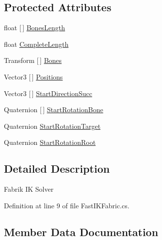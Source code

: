 \subsection*{Protected Attributes}
\begin{DoxyCompactItemize}
\item 
float \mbox{[}$\,$\mbox{]} \mbox{\hyperlink{class_ditzel_games_1_1_fast_i_k_1_1_fast_i_k_fabric_a1e45554459bbf007f925ba70cd489d10}{Bones\+Length}}
\item 
float \mbox{\hyperlink{class_ditzel_games_1_1_fast_i_k_1_1_fast_i_k_fabric_a455382b661f9558006e9ad6fb0745dcc}{Complete\+Length}}
\item 
Transform \mbox{[}$\,$\mbox{]} \mbox{\hyperlink{class_ditzel_games_1_1_fast_i_k_1_1_fast_i_k_fabric_a285d1d2c76ef2e2119a179bb32f0d156}{Bones}}
\item 
Vector3 \mbox{[}$\,$\mbox{]} \mbox{\hyperlink{class_ditzel_games_1_1_fast_i_k_1_1_fast_i_k_fabric_a276fa4e13c8aca407d20828c470908de}{Positions}}
\item 
Vector3 \mbox{[}$\,$\mbox{]} \mbox{\hyperlink{class_ditzel_games_1_1_fast_i_k_1_1_fast_i_k_fabric_af27ff30106ccb2b075bb964fd4091c52}{Start\+Direction\+Succ}}
\item 
Quaternion \mbox{[}$\,$\mbox{]} \mbox{\hyperlink{class_ditzel_games_1_1_fast_i_k_1_1_fast_i_k_fabric_a45917d4f3ced7ff6960e1028eecc1e1a}{Start\+Rotation\+Bone}}
\item 
Quaternion \mbox{\hyperlink{class_ditzel_games_1_1_fast_i_k_1_1_fast_i_k_fabric_a949c0d37925d313814818fd4555a9abe}{Start\+Rotation\+Target}}
\item 
Quaternion \mbox{\hyperlink{class_ditzel_games_1_1_fast_i_k_1_1_fast_i_k_fabric_a61e3ef10d16e5be57a438ef5f179205f}{Start\+Rotation\+Root}}
\end{DoxyCompactItemize}


\subsection{Detailed Description}
Fabrik IK Solver 



Definition at line 9 of file Fast\+I\+K\+Fabric.\+cs.



\subsection{Member Data Documentation}
\mbox{\label{class_ditzel_games_1_1_fast_i_k_1_1_fast_i_k_fabric_ae67f8004d46300b070eda8897034609a}} 

